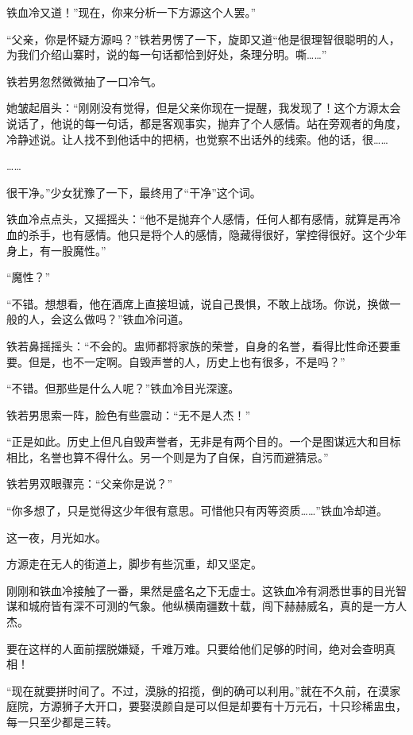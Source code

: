 
\begin{this_body}



铁血冷又道！”现在，你来分析一下方源这个人罢。”

“父亲，你是怀疑方源吗？”铁若男愣了一下，旋即又道“他是很理智很聪明的人，为我们介绍山寨时，说的每一句话都恰到好处，条理分明。嘶……”

铁若男忽然微微抽了一口冷气。

她皱起眉头：“刚刚没有觉得，但是父亲你现在一提醒，我发现了！这个方源太会说话了，他说的每一句话，都是客观事实，抛弃了个人感情。站在旁观者的角度，冷静述说。让人找不到他话中的把柄，也觉察不出话外的线索。他的话，很……

……

很干净。”少女犹豫了一下，最终用了“干净”这个词。

铁血冷点点头，又摇摇头：“他不是抛弃个人感情，任何人都有感情，就算是再冷血的杀手，也有感情。他只是将个人的感情，隐藏得很好，掌控得很好。这个少年身上，有一股魔性。”

“魔性？”

“不错。想想看，他在酒席上直接坦诚，说自己畏惧，不敢上战场。你说，换做一般的人，会这么做吗？”铁血冷问道。

铁若鼻摇摇头：“不会的。盅师都将家族的荣誉，自身的名誉，看得比性命还要重要。但是，也不一定啊。自毁声誉的人，历史上也有很多，不是吗？”

“不错。但那些是什么人呢？”铁血冷目光深邃。

铁若男思索一阵，脸色有些震动：“无不是人杰！”

“正是如此。历史上但凡自毁声誉者，无非是有两个目的。一个是图谋远大和目标相比，名誉也算不得什么。另一个则是为了自保，自污而避猜忌。”

铁若男双眼骤亮：“父亲你是说？”

“你多想了，只是觉得这少年很有意思。可惜他只有丙等资质……”铁血冷却道。

这一夜，月光如水。

方源走在无人的街道上，脚步有些沉重，却又坚定。

刚刚和铁血冷接触了一番，果然是盛名之下无虚士。这铁血冷有洞悉世事的目光智谋和城府皆有深不可测的气象。他纵横南疆数十载，闯下赫赫威名，真的是一方人杰。

要在这样的人面前摆脱嫌疑，千难万难。只要给他们足够的时间，绝对会查明真相！

“现在就要拼时间了。不过，漠脉的招揽，倒的确可以利用。”就在不久前，在漠家庭院，方源狮子大开口，要娶漠颜自是可以但是却要有十万元石，十只珍稀盅虫，每一只至少都是三转。


\end{this_body}
